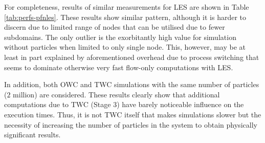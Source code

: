 \documentclass{pracamgren}
\begin{document}
For completeness, results of similar measurements for LES are shown in Table \ref{tab:perfs-pfnles}.
These results show similar pattern, although it is harder to discern due to limited range of nodes that can be utilised due to fewer subdomains.
The only outlier is the exorbitantly high value for simulation without particles when limited to only single node.
This, however, may be at least in part explained by aforementioned overhead due to process switching that seems to dominate otherwise very fast flow-only computations with LES.

In addition, both OWC and TWC simulations with the same number of particles ($2$ million) are considered.
These results clearly show that additional computations due to TWC (Stage 3) have barely noticeable influence on the execution times.
Thus, it is not TWC itself that makes simulations slower but the necessity of increasing the number of particles in the system to obtain physically significant results.
\end{document}
